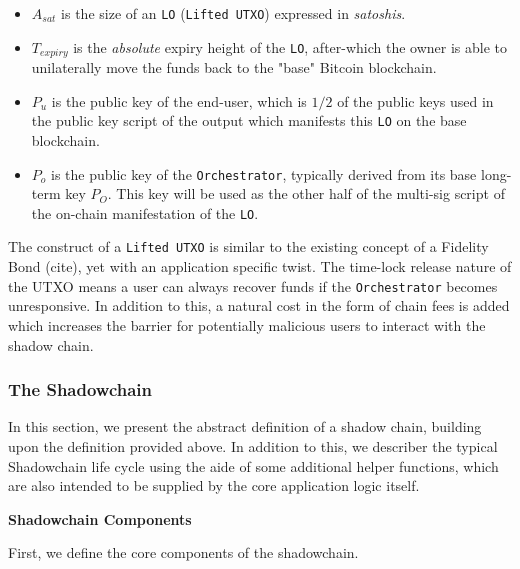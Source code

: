 \documentclass[12pt,a4paper]{article}
\theoremstyle{definition}
\begin{document}
\begin{itemize}
    \item $A_{sat}$ is the size of an \texttt{LO} (\texttt{Lifted UTXO})
        expressed in \emph{satoshis}.

    \item $T_{expiry}$ is the \emph{absolute} expiry height of the \texttt{LO},
        after-which the owner is able to unilaterally move the funds back to
        the "base" Bitcoin blockchain.

    \item $P_{u}$ is the public key of the end-user, which is $1/2$ of the
        public keys used in the public key script of the output which manifests
        this \texttt{LO} on the base blockchain.

    \item $P_{o}$ is the public key of the \texttt{Orchestrator}, typically
        derived from its base long-term key $P_O$. This key will be used as the
        other half of the multi-sig script of the on-chain manifestation of the
        \texttt{LO}.
\end{itemize}


The construct of a \texttt{Lifted UTXO} is similar to the existing concept of a
Fidelity Bond (cite), yet with an application specific twist. The time-lock
release nature of the UTXO means a user can always recover funds if the
\texttt{Orchestrator} becomes unresponsive. In addition to this, a natural cost
in the form of chain fees is added which increases the barrier for potentially
malicious users to interact with the shadow chain.

\subsubsection{The Shadowchain}

In this section, we present the abstract definition of a shadow chain, building
upon the definition provided above. In addition to this, we describer the
typical Shadowchain life cycle using the aide of some additional helper
functions, which are also intended to be supplied by the core application logic
itself.

\begin{center}
    \textbf{Shadowchain Components}
\end{center}

First, we define the core components of the shadowchain.
\end{document}
